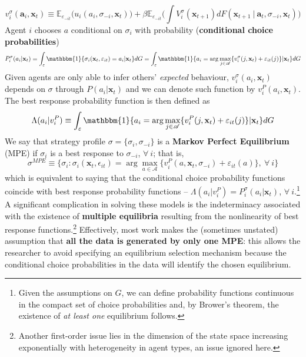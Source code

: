 \documentclass[11pt]{article}
\begin{document}
\begin{equation}
v^\sigma_i(\mathbf{a}_i, \mathbf{x}_t) \equiv \mathbb{E}_{\varepsilon_{-it}} \bigg( u_i (a_i, \sigma_{-i}, \mathbf{x}_t) \bigg) + \beta \mathbb{E}_{\varepsilon_{-it}} \bigg( \int V^\sigma_i(\mathbf{x}_{t + 1}) dF(\mathbf{x}_{t + 1} ~|~ \mathbf{a}_t, \sigma_{-i}, \mathbf{x}_t) \bigg)
\end{equation}
Agent $i$ chooses $a$ conditional on $\sigma_i$ with probability (\textbf{conditional choice probabilities})
\begin{equation}
	P^\sigma_{i}(a_i | \mathbf{x}_t) = \int_\varepsilon \mathbbm{1}\{\sigma_i(\mathbf{x}_t, \varepsilon_{it}) = a_i | \mathbf{x}_t\} dG = \int_\varepsilon \mathbbm{1}\{ a_i = \arg\max_{j \in \mathscr{A}} \{ v^\sigma_i(j, \mathbf{x}_t) + \varepsilon_{it}(j) \} | \mathbf{x}_t\} dG
\end{equation}
Given agents are only able to infer others' \textit{expected} behaviour, $v^\sigma_i(a_i, \mathbf{x}_t)$ depends on $\sigma$ through $P(a_i| \mathbf{x}_t)$ and we can denote such function by $v^P_i(a_i, \mathbf{x}_t)$.
The best response probability function is then defined as
\begin{equation}
\Lambda(a_i | v^P_i) \equiv \int_\varepsilon \mathbbm{1} \{ a_i = \arg\max_{j \in \mathscr{A}} \{ v^P_i(j, \mathbf{x}_t) + \varepsilon_{it}(j) \}| \mathbf{x}_t\}dG
\end{equation}
We say that strategy profile $\sigma = \{\sigma_i, \sigma_{-i}\}$ is a \textbf{Markov Perfect Equilibrium} (MPE) if $\sigma_i$ is a best response to $\sigma_{-i}$, $\forall~i$; that is,
\begin{equation}
	\sigma^{MPE} \equiv \bigg\{\sigma_i : \sigma_i(\mathbf{x}_t, \epsilon_{it}) = \arg\max_{a \in \mathscr{A}} \{ v^P_i(a, \mathbf{x}_t, \sigma_{-i}) + \varepsilon_{it}(a)\}, ~\forall~ i \bigg\}
\end{equation}
which is equivalent to saying that the conditional choice probability functions coincide with best response probability functions -- $\Lambda(a_i | v^P_i) = P^\sigma_{i}(a_i | \mathbf{x}_t)$, $\forall~i$.\footnote{Given the assumptions on $G$, we can define probability functions continuous in the compact set of choice probabilities and, by Brower's theorem, the existence of \textit{at least one} equilibrium follows.} \\
A significant complication in solving these models is the indeterminacy associated with the existence of \textbf{multiple equilibria} resulting from the nonlinearity of best response functions.\footnote{Another first-order issue lies in the dimension of the state space increasing exponentially with heterogeneity in agent types, an issue ignored here.}
Effectively, most work makes the (sometimes unstated) assumption that \textbf{all the data is generated by only one MPE}: this allows the researcher to avoid specifying an equilibrium selection mechanism because the conditional choice probabilities in the data will identify the chosen equilibrium.
\end{document}

